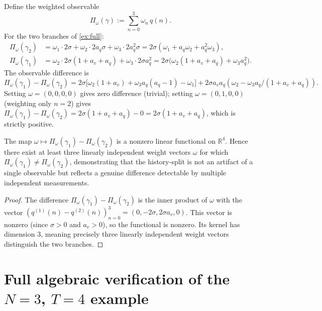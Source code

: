 \documentclass[12pt, oneside]{memoir}
\newcommand{\aq}{a_q}
\newcommand{\av}{a_v}
\begin{document}
\begin{example}
\label{ex:family}
Define the weighted observable
\[
  \Pi_\omega(\gamma) := \sum_{n=0}^{3} \omega_n\, q(n).
\]
For the two branches of \cref{ex:full}:
\begin{align*}
  \Pi_\omega(\gamma_2) &= \omega_1 \cdot 2\sigma + \omega_2 \cdot 2\aq\sigma
    + \omega_3 \cdot 2\aq^2\sigma = 2\sigma(\omega_1 + \aq\omega_2 + \aq^2\omega_3),\\
  \Pi_\omega(\gamma_1) &= \omega_2 \cdot 2\sigma(1+\av+\aq) + \omega_3 \cdot 2\sigma\aq^2
    = 2\sigma\bigl(\omega_2(1+\av+\aq) + \omega_3\aq^2\bigr).
\end{align*}
The observable difference is
\begin{equation}
  \Pi_\omega(\gamma_1) - \Pi_\omega(\gamma_2)
  = 2\sigma\bigl[\omega_2(1 + \av) + \omega_3\aq(\aq - 1) - \omega_1\bigr]
    + 2\sigma\av\aq(\omega_2 - \omega_3\aq/(1+\av+\aq)).
\end{equation}
Setting $\omega = (0,0,0,0)$ gives zero difference (trivial); setting $\omega = (0,1,0,0)$
(weighting only $n=2$) gives $\Pi_\omega(\gamma_1) - \Pi_\omega(\gamma_2) =
2\sigma(1+\av+\aq) - 0 = 2\sigma(1+\av+\aq)$, which is strictly positive.
\end{example}

\begin{proposition}
\label{prop:lin-indep}
The map $\omega \mapsto \Pi_\omega(\gamma_1) - \Pi_\omega(\gamma_2)$ is a nonzero linear
functional on $\mathbb{R}^4$.  Hence there exist at least three linearly independent
weight vectors $\omega$ for which $\Pi_\omega(\gamma_1) \ne \Pi_\omega(\gamma_2)$,
demonstrating that the history-split is not an artifact of a single observable but
reflects a genuine difference detectable by multiple independent measurements.
\end{proposition}

\begin{proof}
The difference $\Pi_\omega(\gamma_1) - \Pi_\omega(\gamma_2)$ is the inner product of
$\omega$ with the vector $(q^{(1)}(n) - q^{(2)}(n))_{n=0}^3 = (0, -2\sigma,
2\sigma\av, 0)$.  This vector is nonzero (since $\sigma > 0$ and $\av > 0$), so the
functional is nonzero.  Its kernel has dimension 3, meaning precisely three linearly
independent weight vectors distinguish the two branches.
\end{proof}

\section{Full algebraic verification of the $N=3$, $T=4$ example}
\end{document}
